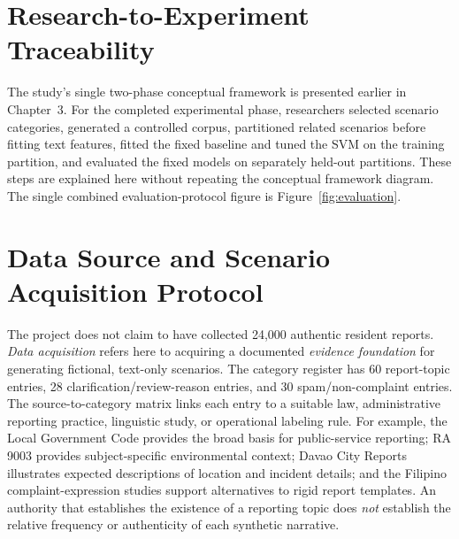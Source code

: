 \section{Research-to-Experiment Traceability}
The study's single two-phase conceptual framework is presented earlier in Chapter~3. For the completed experimental phase, researchers selected scenario categories, generated a controlled corpus, partitioned related scenarios before fitting text features, fitted the fixed baseline and tuned the SVM on the training partition, and evaluated the fixed models on separately held-out partitions. These steps are explained here without repeating the conceptual framework diagram. The single combined evaluation-protocol figure is Figure~\ref{fig:evaluation}.\par

\section{Data Source and Scenario Acquisition Protocol}
The project does not claim to have collected 24,000 authentic resident reports. \emph{Data acquisition} refers here to acquiring a documented \emph{evidence foundation} for generating fictional, text-only scenarios. The category register has 60 report-topic entries, 28 clarification/review-reason entries, and 30 spam/non-complaint entries. The source-to-category matrix links each entry to a suitable law, administrative reporting practice, linguistic study, or operational labeling rule. For example, the Local Government Code \cite{ra7160} provides the broad basis for public-service reporting; RA 9003 \cite{ra9003} provides subject-specific environmental context; Davao City Reports \cite{dcr} illustrates expected descriptions of location and incident details; and the Filipino complaint-expression studies \cite{deleon,quimbo} support alternatives to rigid report templates. An authority that establishes the existence of a reporting topic does \emph{not} establish the relative frequency or authenticity of each synthetic narrative.

